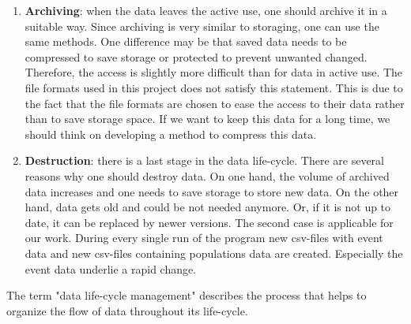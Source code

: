 \begin{enumerate}
	\item \textbf{Archiving}: when the data leaves the active use, one should archive it in a suitable way. Since archiving is very similar to storaging, one can use the same methods. One difference may be that saved data needs to be compressed to save storage or protected to prevent unwanted changed. Therefore, the access is slightly more difficult than for data in active use. The file formats used in this project does not satisfy this statement. This is due to the fact that the file formats are chosen to ease the access to their data rather than to save storage space. If we want to keep this data for a long time, we should think on developing a method to compress this data.
	\item \textbf{Destruction}:  there is a last stage in the data life-cycle. There are several reasons why one should destroy data. On one hand, the volume of archived data increases and one needs to save storage to store new data. On the other hand, data gets old and could be not needed anymore. Or, if it is not up to date, it can be replaced by newer versions. The second case is applicable for our work. During every single run of the program new csv-files with event data and new csv-files containing populations data are created. Especially the event data underlie a rapid change.
\end{enumerate}

The term "data life-cycle management" describes the process that helps to organize the flow of data throughout its life-cycle.